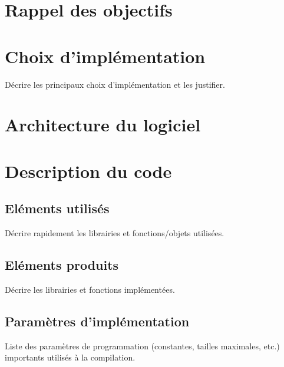 \documentclass[a4paper,12pt]{article}
\begin{document}
  \begin{titlepage}
   \def\titletype{Manuel du programmeur}
   
  \end{titlepage}

  
  \clearpage

  \tableofcontents
  

  \clearpage
  
  \renewcommand{\labelitemi}{$\bullet$}
  \renewcommand{\labelitemii}{$\circ$}
  \renewcommand{\labelitemiii}{$\diamond$}
  \renewcommand{\labelitemiv}{$\ast$}
  
  \section{Rappel des objectifs}


 
 
 \section{Choix d’implémentation}
  Décrire les principaux choix d’implémentation et les justifier.

  
  
  
  \section{Architecture du logiciel}

  
  
  
  \section{Description du code}
    \subsection{Eléments utilisés}
    Décrire rapidement les librairies et fonctions/objets utilisées.
    \subsection{Eléments produits}
    Décrire les librairies et fonctions implémentées.
    \subsection{Paramètres d’implémentation}
    Liste des paramètres de programmation (constantes, tailles maximales, etc.) 
    importants utilisés à la compilation.



\end{document}
